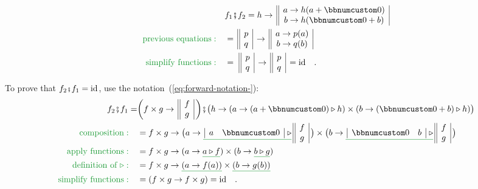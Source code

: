 \begin{align*}
 & f_{1}\bef f_{2}=h\rightarrow\,\begin{array}{||c|}
a\rightarrow h(a+\bbnum 0)\\
b\rightarrow h(\bbnum 0+b)
\end{array}\\
{\color{greenunder}\text{previous equations}:}\quad & =\,\begin{array}{||c|}
p\\
q
\end{array}\,\rightarrow\,\begin{array}{||c|}
a\rightarrow p(a)\\
b\rightarrow q(b)
\end{array}\\
{\color{greenunder}\text{simplify functions}:}\quad & =\,\,\begin{array}{||c|}
p\\
q
\end{array}\,\rightarrow\,\begin{array}{||c|}
p\\
q
\end{array}\,=\text{id}\quad.
\end{align*}

To prove that $f_{2}\bef f_{1}=\text{id}$, use the notation~(\ref{eq:forward-notation-}):
\begin{align*}
f_{2}\bef f_{1}= & \bigg(f\times g\rightarrow\,\begin{array}{||c|}
f\\
g
\end{array}\,\bigg)\bef\big(h\rightarrow(a\rightarrow(a+\bbnum 0)\triangleright h)\times(b\rightarrow(\bbnum 0+b)\triangleright h)\big)\\
{\color{greenunder}\text{composition}:}\quad & =f\times g\rightarrow\big(a\rightarrow\gunderline{\,\begin{array}{|cc|}
a & \bbnum 0\end{array}\,\,\triangleright}\,\begin{array}{||c|}
f\\
g
\end{array}\,\big)\times\big(b\rightarrow\gunderline{\,\begin{array}{|cc|}
\bbnum 0 & b\end{array}\,\,\triangleright}\,\begin{array}{||c|}
f\\
g
\end{array}\,\big)\\
{\color{greenunder}\text{apply functions}:}\quad & =f\times g\rightarrow(a\rightarrow\gunderline{a\triangleright f})\times(b\rightarrow\gunderline{b\triangleright g})\\
{\color{greenunder}\text{definition of }\triangleright:}\quad & =f\times g\rightarrow\gunderline{\left(a\rightarrow f(a)\right)}\times\gunderline{\left(b\rightarrow g(b)\right)}\\
{\color{greenunder}\text{simplify functions}:}\quad & =\left(f\times g\rightarrow f\times g\right)=\text{id}\quad.
\end{align*}

